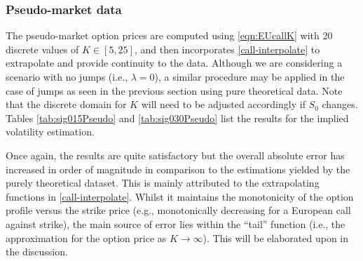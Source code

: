\subsubsection{Pseudo-market data}
The pseudo-market option prices are computed using \eqref{eqn:EUcallK} with 20 discrete values of $K \in [5,25]$, and then incorporates \eqref{call-interpolate} to extrapolate and provide continuity to the data.  Although we are considering a scenario with no jumps (i.e., $\lambda = 0$), a similar procedure may be applied in the case of jumps as seen in the previous section using pure theoretical data. Note that the discrete domain for $K$ will need to be adjusted accordingly if $S_0$ changes. Tables \ref{tab:sig015Pseudo} and \ref{tab:sig030Pseudo} list the results for the implied volatility estimation.

Once again, the results are quite satisfactory but the overall absolute error has increased in order of magnitude in comparison to the estimations yielded by the purely theoretical dataset. This is mainly attributed to the extrapolating functions in \eqref{call-interpolate}. Whilst it maintains the monotonicity of the option profile versus the strike price (e.g., monotonically decreasing for a European call against strike), the main source of error lies within the ``tail'' function (i.e., the approximation for the option price as $K \rightarrow \infty$). This will be elaborated upon in the discussion.

